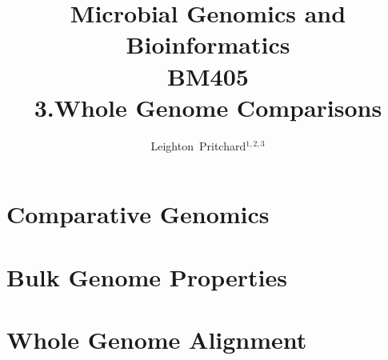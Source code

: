 



\title[Microbial Genomics and Bioinformatics: 3.Whole Genome Comparisons] %
{Microbial Genomics and \\ Bioinformatics \\
BM405 \\
3.Whole Genome Comparisons}
\author[Pritchard] %
{Leighton~Pritchard$^{1,2,3}$}
\subject{Bioinformatics, Genomics, Bacteria, Sequencing, Microbiology, Microbes}





\frame[plain]{\titlepage}



\section{Comparative Genomics}


\section{Bulk Genome Properties}


\section{Whole Genome Alignment}


%


%




